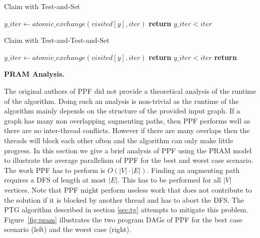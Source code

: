 \documentclass[letterpaper]{article}
\newcommand{\mypar}[1]{{\bf #1.}}
\begin{document}
\begin{algorithm}
    \caption{Claim with Test-and-Set}
    \label{alg:claim_tas}
    \begin{algorithmic}[1]
            \State $y\_iter \gets atomic\_exchange(visited[y], iter)$
            \State \textbf{return} $y\_iter < iter$
        \EndProcedure
    \end{algorithmic}
\end{algorithm}


\begin{algorithm}
    \caption{Claim with Test-and-Test-and-Set}
    \label{alg:claim_ttas}
    \begin{algorithmic}[1]
                \State $y\_iter \gets atomic\_exchange(visited[y], iter)$
                \State \textbf{return} $y\_iter < iter$
            \EndIf
            \State \textbf{return} \False
        \EndProcedure
    \end{algorithmic}
\end{algorithm}

\mypar{PRAM Analysis}

The original authors of PPF did not provide a theoretical analysis of the runtime of the algorithm.
Doing such an analysis is non-trivial as the runtime of the algorithm mainly depends on the structure of the provided
input graph. If a graph has many non overlapping augmenting paths, then PPF performs well as there are no inter-thread conflicts. 
However if there are many overlaps then the threads will block each other often and the algorithm can only make little progress.
In this section we give a brief analysis of PPF using the PRAM model to illustrate the average parallelism of PPF for the best and worst case
scenario. \\

The work PPF has to perform is $O(|V|\cdot|E|)$. Finding an augmenting path requires a DFS of length at most $|E|$. 
This has to be performed for all $|V|$ vertices. Note that PPF might perform useless work that does not contribute to the solution
if it is blocked by another thread and has to abort the DFS. 
The PTG algorithm described in section \ref{sec:tg} attempts to mitigate this problem.\\

Figure~\ref{fig:pram} illustrates the two program DAGs of PPF for the best case scenario (left) and the worst case (right).
\end{document}
